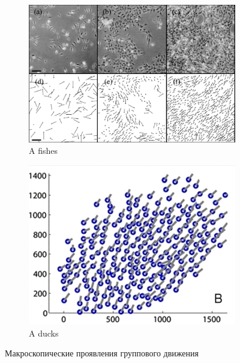     \begin{figure}
    	\centering
        \begin{subfigure}{0.4\textwidth}
                \includegraphics[width=\textwidth]{Images/Fig17_CollectiveMotion}
                \caption{A fishes}
                \label{fig:CollMot:fishes}
        \end{subfigure}
        \begin{subfigure}{0.4\textwidth}
                \includegraphics[width=\textwidth]{Images/Fig29_CollectiveMotion_part}
                \caption{A ducks}
                \label{fig:CollMot:ducks}
        \end{subfigure}
        \caption{Макроскопические проявления группового движения}\label{fig:CollMot:macroscopic}
	\end{figure}

